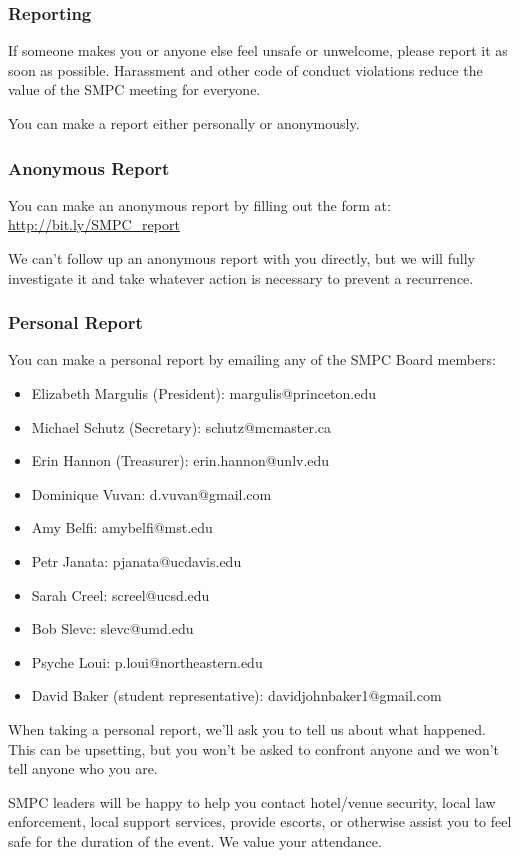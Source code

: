 \subsubsection*{Reporting}

If someone makes you or anyone else feel unsafe or unwelcome, please report it as soon as possible. Harassment and other code of conduct violations reduce the value of the SMPC meeting for everyone. 

You can make a report either personally or anonymously.

\subsubsection*{Anonymous Report}

You can make an anonymous report by filling out the form at: \url{http://bit.ly/SMPC_report} 

We can't follow up an anonymous report with you directly, but we will fully investigate it and take whatever action is necessary to prevent a recurrence.

\subsubsection*{Personal Report}

You can make a personal report by emailing any of the SMPC Board members:
\begin{itemize}
\item Elizabeth Margulis (President): margulis@princeton.edu
\item Michael Schutz (Secretary): schutz@mcmaster.ca
\item Erin Hannon (Treasurer): erin.hannon@unlv.edu
\item Dominique Vuvan: d.vuvan@gmail.com
\item Amy Belfi: amybelfi@mst.edu 
\item Petr Janata: pjanata@ucdavis.edu 
\item Sarah Creel: screel@ucsd.edu
\item Bob Slevc: slevc@umd.edu 
\item Psyche Loui: p.loui@northeastern.edu 
\item David Baker (student representative): davidjohnbaker1@gmail.com 
\end{itemize}
When taking a personal report, we'll ask you to tell us about what happened. This can be upsetting, but you won't be asked to confront anyone and we won't tell anyone who you are.

SMPC leaders will be happy to help you contact hotel/venue security, local law enforcement, local support services, provide escorts, or otherwise assist you to feel safe for the duration of the event. We value your attendance.
